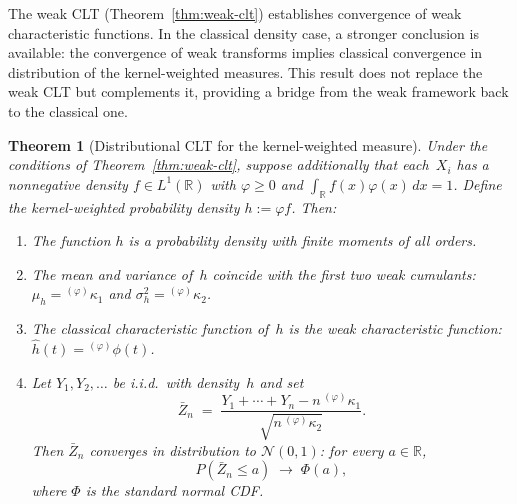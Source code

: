 \documentclass[12pt]{article}
\newtheorem{theorem}{Theorem}[section]
\theoremstyle{definition}
\newcommand{\R}{\mathbb{R}}
\begin{document}
The weak CLT (Theorem~\ref{thm:weak-clt}) establishes convergence of weak
characteristic functions.  In the classical density case, a stronger
conclusion is available: the convergence of weak transforms implies
classical convergence in distribution of the kernel-weighted measures.
This result does not replace the weak CLT but complements it, providing
a bridge from the weak framework back to the classical one.

\begin{theorem}[Distributional CLT for the kernel-weighted measure]
\label{thm:distributional-clt}
Under the conditions of Theorem~\ref{thm:weak-clt}, suppose additionally
that each~$X_i$ has a nonnegative density $f\in L^1(\R)$ with
$\varphi\ge 0$ and $\int_\R f(x)\varphi(x)\,dx = 1$.  Define the
kernel-weighted probability density $h := \varphi f$.  Then:
\begin{enumerate}[label=(\alph*)]
\item The function $h$ is a probability density with finite moments of all
orders.

\item The mean and variance of~$h$ coincide with the first two weak
cumulants:
$\mu_h = {}^{(\varphi)}\kappa_1$ and $\sigma_h^2 = {}^{(\varphi)}\kappa_2$.

\item The classical characteristic function of~$h$ is the weak
characteristic function: $\widehat{h}(t) = {}^{(\varphi)}\phi(t)$.

\item Let $Y_1,Y_2,\ldots$ be i.i.d.\ with density~$h$ and set
\[
\bar{Z}_n
\;=\;
\frac{Y_1+\cdots+Y_n - n\,{}^{(\varphi)}\kappa_1}
     {\sqrt{n\,{}^{(\varphi)}\kappa_2}}.
\]
Then $\bar{Z}_n$ converges in distribution to $\mathcal{N}(0,1)$:
for every $a\in\R$,
\[
P(\bar{Z}_n \le a)
\;\longrightarrow\;
\Phi(a),
\]
where $\Phi$ is the standard normal CDF.
\end{enumerate}
\end{theorem}
\end{document}
